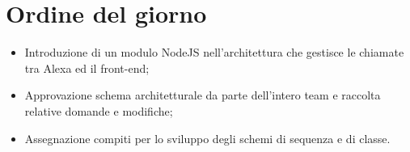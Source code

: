 \documentclass[../verbale-2017-02-16.tex]{subfiles}
\begin{document}
	
\section{Ordine del giorno}
	\begin{itemize}
		\item Introduzione di un modulo NodeJS nell'architettura che gestisce le chiamate tra Alexa ed il front-end;
		\item Approvazione schema architetturale da parte dell'intero team e raccolta relative domande e modifiche;
		\item Assegnazione compiti per lo sviluppo degli schemi di sequenza e di classe.
	\end{itemize}
	
\end{document}
